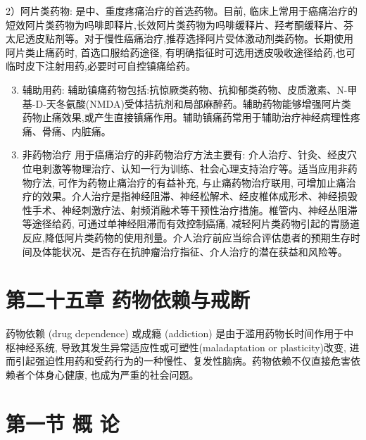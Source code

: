 \documentclass[10pt]{article}
\begin{document}
2）阿片类药物: 是中、重度疼痛治疗的首选药物。目前, 临床上常用于癌痛治疗的短效阿片类药物为吗啡即释片,长效阿片类药物为吗啡缓释片、羟考酮缓释片、芬太尼透皮贴剂等。对于慢性癌痛治疗,推荐选择阿片受体激动剂类药物。长期使用阿片类止痛药时, 首选口服给药途径, 有明确指征时可选用透皮吸收途径给药,也可临时皮下注射用药,必要时可自控镇痛给药。

\begin{enumerate}
  \setcounter{enumi}{2}
  \item 辅助用药: 辅助镇痛药物包括:抗惊厥类药物、抗抑郁类药物、皮质激素、N-甲基-D-天冬氨酸(NMDA)受体拮抗剂和局部麻醉药。辅助药物能够增强阿片类药物止痛效果,或产生直接镇痛作用。辅助镇痛药常用于辅助治疗神经病理性疼痛、骨痛、内脏痛。
\end{enumerate}

\begin{enumerate}
  \setcounter{enumi}{2}
  \item 非药物治疗 用于癌痛治疗的非药物治疗方法主要有: 介人治疗、针灸、经皮穴位电刺激等物理治疗、认知一行为训练、社会心理支持治疗等。适当应用非药物疗法, 可作为药物止痛治疗的有益补充, 与止痛药物治疗联用, 可增加止痛治疗的效果。介人治疗是指神经阻滞、神经松解术、经皮椎体成形术、神经损毁性手术、神经刺激疗法、射频消融术等干预性治疗措施。椎管内、神经丛阻滞等途径给药, 可通过单神经阻滞而有效控制癌痛, 减轻阿片类药物引起的胃肠道反应,降低阿片类药物的使用剂量。介人治疗前应当综合评估患者的预期生存时间及体能状况、是否存在抗肿瘤治疗指征、介人治疗的潜在获益和风险等。
\end{enumerate}

\section*{第二十五章 药物依赖与戒断}
药物依赖 (drug dependence) 或成瘾 (addiction) 是由于滥用药物长时间作用于中枢神经系统, 导致其发生异常适应性或可塑性(maladaptation or plasticity)改变, 进而引起强迫性用药和受药行为的一种慢性、复发性脑病。药物依赖不仅直接危害依赖者个体身心健康, 也成为严重的社会问题。

\section*{第一节 概 论}
\end{document}
